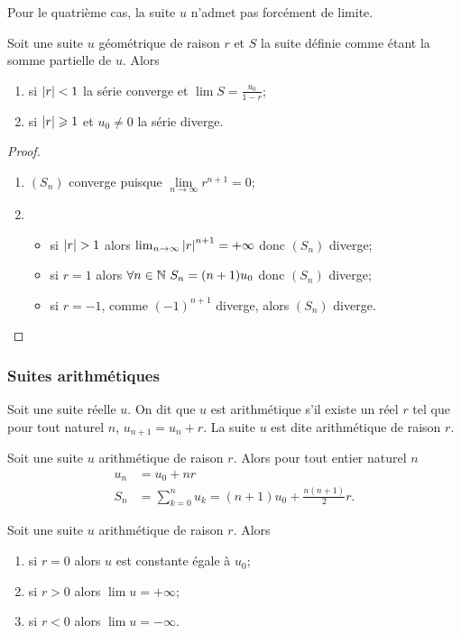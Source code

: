 Pour le quatrième cas, la suite \(u\) n'admet pas forcément de limite.
\begin{prop}
  Soit une suite \(u\) géométrique de raison \(r\) et \(S\) la suite définie comme étant la somme partielle de \(u\). Alors
  \begin{enumerate}
  \item si \(\left\lvert r\right\rvert < 1\) la série converge et \(\lim S = \frac{u_0}{1-r}\);
  \item si \(\left\lvert r\right\rvert \geqslant 1\) et \(u_0 \neq 0\) la série diverge.
  \end{enumerate}
\end{prop}
\begin{proof}
  \begin{enumerate}
  \item \((S_n)\) converge puisque \(\lim\limits_{n \to \infty} r^{n+1}=0\);
  \item 
    \begin{itemize} 
    \item si \(\left\lvert r\right\rvert>1\) alors \(\lim_{n \to \infty} \left\lvert r\right\rvert^{n+1}=+\infty\) donc \((S_n)\) diverge;
    \item si \(r=1\) alors \(\forall n \in \mathbb{N} \ S_n=(n+1)u_0\) donc \((S_n)\) diverge;
    \item si \(r=-1\), comme \((-1)^{n+1}\) diverge, alors \((S_n)\) diverge.
    \end{itemize}
  \end{enumerate}
\end{proof}

\subsubsection{Suites arithmétiques}

\begin{defdef}
  Soit une suite réelle \(u\). On dit que \(u\) est arithmétique s'il existe un réel \(r\) tel que pour tout naturel \(n\), \(u_{n+1}=u_n +r\). La suite \(u\) est dite arithmétique de raison \(r\).
\end{defdef}
\begin{prop}
  Soit une suite \(u\) arithmétique de raison \(r\). Alors pour tout entier naturel \(n\)
  \begin{align}
      u_n &= u_0+nr \\
      S_n &=\sum_{k=0}^n u_k = (n+1)u_0 + \frac{n(n+1)}{2}r.
  \end{align}
\end{prop}
\begin{prop}
  Soit une suite \(u\) arithmétique de raison \(r\). Alors
  \begin{enumerate}
  \item si \(r=0\) alors \(u\) est constante égale à \(u_0\);
  \item si \(r>0\) alors \(\lim u =+\infty\);
  \item si \(r<0\) alors \(\lim u =-\infty\).
  \end{enumerate}
\end{prop}

